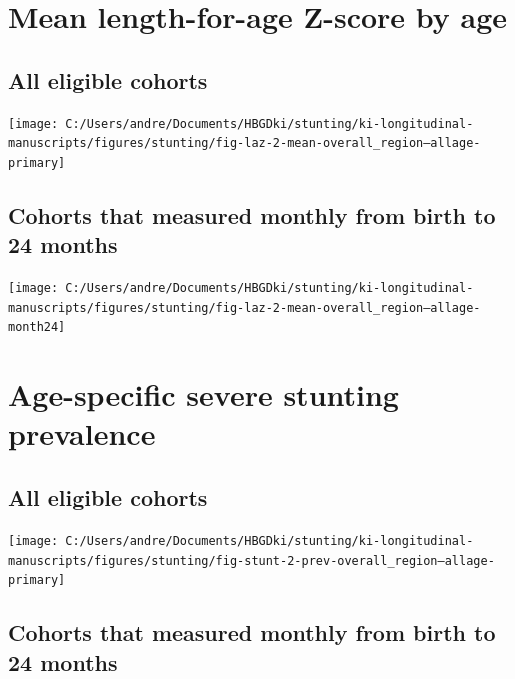 \documentclass[
  9pt,
]{book}
\begin{document}
\hypertarget{mean-length-for-age-z-score-by-age-2}{%
\section{Mean length-for-age Z-score by age}\label{mean-length-for-age-z-score-by-age-2}}

\hypertarget{all-eligible-cohorts}{%
\subsection{All eligible cohorts}\label{all-eligible-cohorts}}

\texttt{[image: C:/Users/andre/Documents/HBGDki/stunting/ki-longitudinal-manuscripts/figures/stunting/fig-laz-2-mean-overall\_region--allage-primary]}

\hypertarget{cohorts-that-measured-monthly-from-birth-to-24-months}{%
\subsection{Cohorts that measured monthly from birth to 24 months}\label{cohorts-that-measured-monthly-from-birth-to-24-months}}

\texttt{[image: C:/Users/andre/Documents/HBGDki/stunting/ki-longitudinal-manuscripts/figures/stunting/fig-laz-2-mean-overall\_region--allage-month24]}

\hypertarget{age-specific-severe-stunting-prevalence-1}{%
\section{Age-specific severe stunting prevalence}\label{age-specific-severe-stunting-prevalence-1}}

\hypertarget{all-eligible-cohorts-1}{%
\subsection{All eligible cohorts}\label{all-eligible-cohorts-1}}

\texttt{[image: C:/Users/andre/Documents/HBGDki/stunting/ki-longitudinal-manuscripts/figures/stunting/fig-stunt-2-prev-overall\_region--allage-primary]}

\hypertarget{cohorts-that-measured-monthly-from-birth-to-24-months-1}{%
\subsection{Cohorts that measured monthly from birth to 24 months}\label{cohorts-that-measured-monthly-from-birth-to-24-months-1}}
\end{document}
